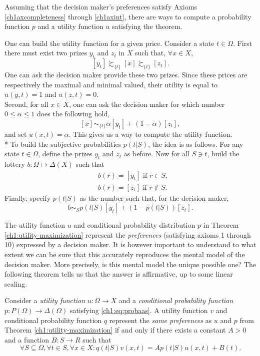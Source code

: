 \begin{example}
Assuming that the decision maker's preferences satisfy Axioms \ref{ch1axcompleteness} through \ref{ch1axint}, there are ways to compute a probability function $p$ and a utility function $u$ satisfying the theorem.

One can build the utility function for a given price. Consider a state $t \in \Omega$. First there must exist two prizes $y_t$ and $z_t$ in $X$ such that, $\forall x \in X$,
$$ [y_t]\succsim_{\{t\}} [x] \succsim_{\{t\}} [z_t].$$
One can ask the decision maker provide these two prizes. Since these prices are respectively the maximal and minimal valued, their utility is equal to $u(y,t)=1$ and
$u(z,t)=0$.\\
Second, for all $x \in X$, one can ask the decision maker for which number $0 \leq \alpha \leq 1 $ does the following hold,
$$ [x] \sim_{\{t\}} \alpha[y_t] + (1-\alpha) [z_t],$$
and set $u(x,t) = \alpha.$
This gives us a way to compute the utility function. \\*
To build the subjective probabilities $p(t|S)$, the idea is as follows. For any state $t\in \Omega$, define the prizes $y_t$ and $z_t$ as before. Now for all $S \ni t$, build the lottery $b : \Omega \mapsto \Delta(X)$ such that
$$
\begin{aligned}
& b(r) = [y_t] \text{ if $r \in S$}, \\
& b(r) = [z_t] \text{ if $r \not \in S$}.
\end{aligned}
$$
Finally, specify $p(t|S)$ as the number such that, for the decision maker,
$$ b \sim_S p(t|S) [y_t] + (1-p(t|S)) [z_t].$$
\end{example}


The utility function $u$ and conditional probability distribution $p$ in Theorem \ref{ch1:utility-maximization} represent the \emph{preferences} (satisfying axioms 1 through 10) expressed by a decision maker.
It is however important to understand to what extent  we can be sure that this accurately reproduces the mental model of the decision maker. More precisely, is this mental model the unique possible one?  The following theorem tells us that the answer is affirmative, up to some linear scaling.

\begin{theorem}
Consider a \emph{utility function} $u : \Omega \rightarrow X$ and a \emph{conditional probability function} $p : P(\Omega) \rightarrow \Delta(\Omega)$ satisfying \ref{ch1:eq:probaas}.
A utility function $v$ and conditional probability function $q$ represent the \emph{same preferences} as $u$ and $p$ from Theorem \ref{ch1:utility-maximization} if and only if there  exists a constant $A > 0$ and a function $B : S \rightarrow R$ such that
$$ \forall S \subseteq \Omega, \forall t \in S, \forall x \in X: q(t|S) v(x,t) = Ap(t|S)u(x,t) + B(t). $$
\label{chap1:thm:Equivalent}
\end{theorem}


